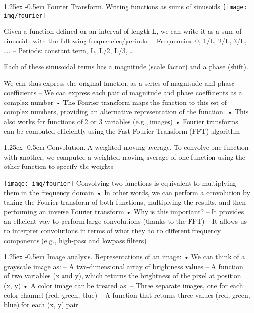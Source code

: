 \documentclass[8pt]{article}
\makeatletter
\newlength{\norm}
\newlength{\nrm}
\renewcommand{\paragraph}{%
  \@startsection{paragraph}{4}%
  {\z@}{1.25ex \@plus 2pt \@minus 2pt}{-0.5em}%
  {\fontsize{\f@size}{\nrm}\normalfont\bfseries}%
}
\makeatother
\begin{document}
{\begin{multicols*}{5}

\paragraph{Fourier Transform.} Writing functions as sums of sinusoids
\texttt{[image: img/fourier]}

Given a function defined on an interval of length L, we can write it as
a sum of sinusoids with the following frequencies/periods:
– Frequencies: 0, 1/L, 2/L, 3/L, ….
– Periods: constant term, L, L/2, L/3, …

Each of these sinusoidal terms has a magnitude
(scale factor) and a phase (shift).

We can thus express the original function as a series of
magnitude and phase coefficients
– We can express each pair of magnitude and phase coefficients as a
complex number
• The Fourier transform maps the function to this set of complex
numbers, providing an alternative representation of the function.
• This also works for functions of 2 or 3 variables (e.g., images)
• Fourier transforms can be computed efficiently using the Fast
Fourier Transform (FFT) algorithm

\paragraph{Convolution.} A weighted moving average. 
To convolve one function with another, we computed a
weighted moving average of one function using the
other function to specify the weights

\texttt{[image: img/fourier]}
Convolving two functions is equivalent to multiplying
them in the frequency domain
• In other words, we can perform a convolution by taking
the Fourier transform of both functions, multiplying the
results, and then performing an inverse Fourier
transform
• Why is this important?
– It provides an efficient way to perform large convolutions
(thanks to the FFT)
– It allows us to interpret convolutions in terms of what they do
to different frequency components (e.g., high-pass and lowpass
filters)

\paragraph{Image analysis.} Representations of an image: 
• We can think of a grayscale image
as:
– A two-dimensional array of brightness
values
– A function of two variables (x and y),
which returns the brightness of the pixel
at position (x, y)
• A color image can be treated as:
– Three separate images, one for each
color channel (red, green, blue)
– A function that returns three values (red,
green, blue) for each (x, y) pair


\end{multicols*}}
\end{document}
